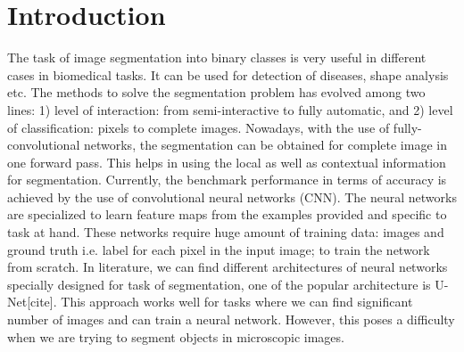 %


\chapter{Introduction}


The task of image segmentation into binary classes is very useful in different cases in biomedical tasks. It can be used for detection of diseases, shape analysis etc. The methods to solve the segmentation problem has evolved among two lines: 1) level of interaction: from semi-interactive to fully automatic, and 2) level of classification: pixels to complete images. Nowadays, with the use of fully-convolutional networks, the segmentation can be obtained for complete image in one forward pass. This helps in using the local as well as contextual information for segmentation. Currently, the benchmark performance in terms of accuracy is achieved by the use of convolutional neural networks (CNN). The neural networks are specialized to learn feature maps from the examples provided and specific to task at hand. These networks require huge amount of training data: images and ground truth i.e. label for each pixel in the input image; to train the network from scratch. In literature, we can find different architectures of neural networks specially designed for task of segmentation, one of the popular architecture is U-Net[cite]. This approach works well for tasks where we can find significant number of images and can train a neural network. However, this poses a difficulty when we are trying to segment objects in microscopic images.

